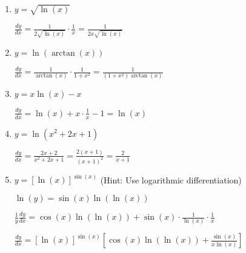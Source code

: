 \documentclass{article}
\begin{document}
\begin{enumerate}
\item $y = \sqrt{\ln(x)}$

    $\frac{dy}{dx} = \frac{1}{2 \sqrt{\ln(x)}} \cdot \frac{1}{x} = \frac{1}{2x \sqrt{\ln(x)}}$

\item $y = \ln(\arctan(x))$

    $\frac{dy}{dx} = \frac{1}{\arctan(x)} \cdot \frac{1}{1+x^2} = \frac{1}{(1+x^2)\arctan(x)}$

\item $y = x \ln(x) - x$

    $\frac{dy}{dx} = \ln(x) + x \cdot \frac{1}{x} - 1 = \ln(x)$

\item $y = \ln(x^2 + 2x + 1)$

    $\frac{dy}{dx} = \frac{2x + 2}{x^2 + 2x + 1} = \frac{2(x+1)}{(x+1)^2} = \frac{2}{x+1}$

\item $y = [\ln(x)]^{\sin(x)}$ (Hint: Use logarithmic differentiation)

    $\ln(y) = \sin(x) \ln(\ln(x))$

    $\frac{1}{y} \frac{dy}{dx} = \cos(x) \ln(\ln(x)) + \sin(x) \cdot \frac{1}{\ln(x)} \cdot \frac{1}{x}$

    $\frac{dy}{dx} = [\ln(x)]^{\sin(x)} \left[ \cos(x) \ln(\ln(x)) + \frac{\sin(x)}{x \ln(x)} \right]$
\end{enumerate}
\end{document}
